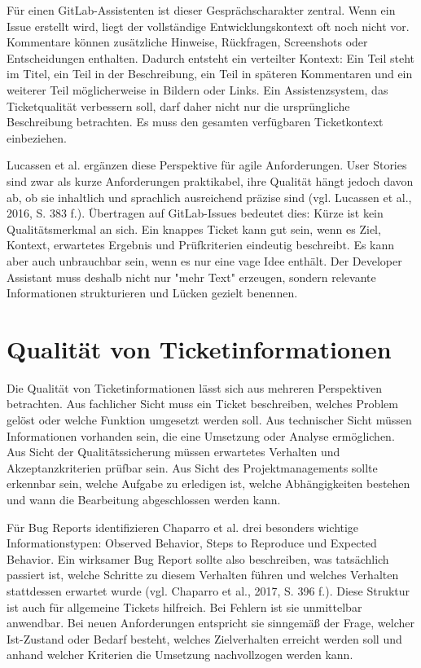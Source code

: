 \documentclass[12pt,a4paper,oneside]{scrreprt}
\begin{document}
Für einen GitLab-Assistenten ist dieser Gesprächscharakter zentral. Wenn ein Issue erstellt wird, liegt der vollständige Entwicklungskontext oft noch nicht vor. Kommentare können zusätzliche Hinweise, Rückfragen, Screenshots oder Entscheidungen enthalten. Dadurch entsteht ein verteilter Kontext: Ein Teil steht im Titel, ein Teil in der Beschreibung, ein Teil in späteren Kommentaren und ein weiterer Teil möglicherweise in Bildern oder Links. Ein Assistenzsystem, das Ticketqualität verbessern soll, darf daher nicht nur die ursprüngliche Beschreibung betrachten. Es muss den gesamten verfügbaren Ticketkontext einbeziehen.

Lucassen et al. ergänzen diese Perspektive für agile Anforderungen. User Stories sind zwar als kurze Anforderungen praktikabel, ihre Qualität hängt jedoch davon ab, ob sie inhaltlich und sprachlich ausreichend präzise sind (vgl. Lucassen et al., 2016, S. 383 f.). Übertragen auf GitLab-Issues bedeutet dies: Kürze ist kein Qualitätsmerkmal an sich. Ein knappes Ticket kann gut sein, wenn es Ziel, Kontext, erwartetes Ergebnis und Prüfkriterien eindeutig beschreibt. Es kann aber auch unbrauchbar sein, wenn es nur eine vage Idee enthält. Der Developer Assistant muss deshalb nicht nur "mehr Text" erzeugen, sondern relevante Informationen strukturieren und Lücken gezielt benennen.

\section{Qualität von Ticketinformationen}

Die Qualität von Ticketinformationen lässt sich aus mehreren Perspektiven betrachten. Aus fachlicher Sicht muss ein Ticket beschreiben, welches Problem gelöst oder welche Funktion umgesetzt werden soll. Aus technischer Sicht müssen Informationen vorhanden sein, die eine Umsetzung oder Analyse ermöglichen. Aus Sicht der Qualitätssicherung müssen erwartetes Verhalten und Akzeptanzkriterien prüfbar sein. Aus Sicht des Projektmanagements sollte erkennbar sein, welche Aufgabe zu erledigen ist, welche Abhängigkeiten bestehen und wann die Bearbeitung abgeschlossen werden kann.

Für Bug Reports identifizieren Chaparro et al. drei besonders wichtige Informationstypen: Observed Behavior, Steps to Reproduce und Expected Behavior. Ein wirksamer Bug Report sollte also beschreiben, was tatsächlich passiert ist, welche Schritte zu diesem Verhalten führen und welches Verhalten stattdessen erwartet wurde (vgl. Chaparro et al., 2017, S. 396 f.). Diese Struktur ist auch für allgemeine Tickets hilfreich. Bei Fehlern ist sie unmittelbar anwendbar. Bei neuen Anforderungen entspricht sie sinngemäß der Frage, welcher Ist-Zustand oder Bedarf besteht, welches Zielverhalten erreicht werden soll und anhand welcher Kriterien die Umsetzung nachvollzogen werden kann.
\end{document}
